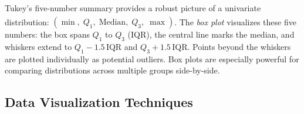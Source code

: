 \begin{tcbitemize}[ skin=sectionraster ]
    \tcbitem[title={Five-Number Summary \& Box Plot}, raster multicolumn=6]
    Tukey's five-number summary provides a robust picture of a univariate distribution\textsuperscript{\cite{brucePracticalStatisticsData2017}}:
    $(\min,\; Q_1,\; \text{Median},\; Q_3,\; \max)$.
    The \emph{box plot} visualizes these five numbers: the box spans $Q_1$ to $Q_3$ (IQR), the central line marks the median, and whiskers extend to $Q_1 - 1.5\,\text{IQR}$ and $Q_3 + 1.5\,\text{IQR}$.
    Points beyond the whiskers are plotted individually as potential outliers.
    Box plots are especially powerful for comparing distributions across multiple groups side-by-side.
    \tcblower
    \begin{center}
\label{fig:ch04-data-analytics-inline-01}
    \end{center}
\end{tcbitemize}

\subsection{Data Visualization Techniques}

